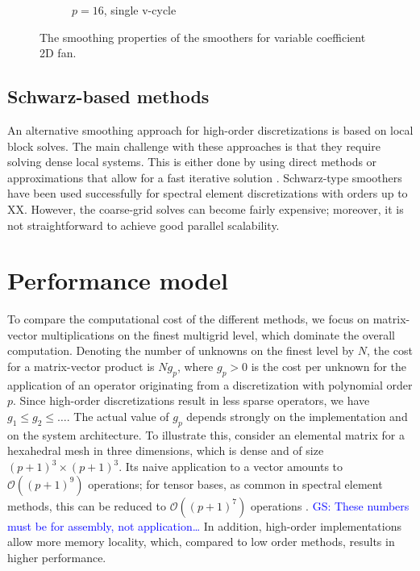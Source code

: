 \documentclass[smallcondensed,final]{svjour3}     %
\newcommand{\gsnote}[1]{\textcolor{blue}{GS: #1}}
\begin{document}
\begin{figure}
\begin{subfigure}[b]{0.49\textwidth}
		\caption{$p=16$, single v-cycle}
	\end{subfigure}
	\caption{\label{fig:smoothers-var} The smoothing properties of the smoothers for variable coefficient 2D fan.}
\end{figure}


\subsection{Schwarz-based methods}\label{subsec:schwarz}
An alternative smoothing approach for high-order discretizations is
based on local block solves.  The main challenge with these approaches
is that they require solving dense local systems.  This is either done
by using direct methods or approximations that allow for a fast
iterative solution
\cite{LottesFischer05,FischerLottes05}. Schwarz-type smoothers have
been used successfully for spectral element discretizations with
orders up to XX. However, the coarse-grid solves can become fairly
expensive; moreover, it is not straightforward to achieve good
parallel scalability.




\section{Performance model}
To compare the computational cost of the different methods, we focus
on matrix-vector multiplications on the finest multigrid level, which
dominate the overall computation. Denoting the number of unknowns on
the finest level by $N$, the cost for a matrix-vector product is
$Ng_p$, where $g_p>0$ is the cost per unknown for the application of
an operator originating from a discretization with polynomial order
$p$. Since high-order discretizations result in less sparse operators,
we have $g_1\le g_2\le \ldots$. The actual value of $g_p$ depends
strongly on the implementation and on the system architecture. To
illustrate this, consider an elemental matrix for a hexahedral mesh in
three dimensions, which is dense and of size $(p+1)^3\times
(p+1)^3$. Its naive application to a vector amounts to $\mathcal
O((p+1)^9)$ operations; for tensor bases, as common in spectral
element methods, this can be reduced to $\mathcal O((p+1)^7)$
operations \cite{DevilleFischerMund02}. \gsnote{These numbers must be
  for assembly, not application\ldots} In addition, high-order
implementations allow more memory locality, which, compared to low
order methods, results in higher performance.
\end{document}
